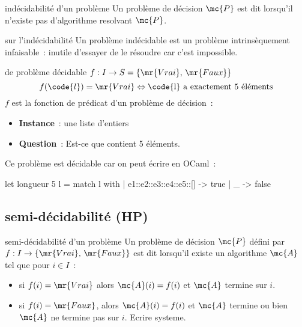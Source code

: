 \begin{adjustwidth}{-3cm}{-3cm}
\begin{definition}{}{indécidabilité d'un problème}
    Un problème de décision $\mc{P}$ est dit  lorsqu'il n'existe pas d'algorithme resolvant $\mc{P}$.
\end{definition}

\begin{remarque}{}{sur l'indécidabilité}
    Un problème indécidable est un problème intrinsèquement infaisable~: inutile d'essayer de le résoudre car c'est impossible.
\end{remarque}

\begin{exemple}{}{de problème décidable}
    $f : I \to S = \{\mr{Vrai},\, \mr{Faux}\}$\\
    $$f(\code{l}) = \mr{Vrai} \Leftrightarrow \text{\code{l} a exactement 5 éléments}$$
    $f$ est la fonction de prédicat d'un problème de décision~:
    \begin{itemize}
        \item \textbf{Instance}~:  une liste d'entiers
        \item \textbf{Question}~: Est-ce que  contient 5 éléments.
    \end{itemize}
    Ce problème est décidable car on peut écrire en OCaml~:
    \begin{lstOCaml}
    let longueur 5 l =
        match l with
        | e1::e2::e3::e4::e5::[] -> true
        | _ -> false
    \end{lstOCaml}
\end{exemple}

\subsection{semi-décidabilité (HP)}

\begin{definition}{}{semi-décidabilité d'un problème}
    Un problème de décision $\mc{P}$ défini par $f:I \to \{\mr{Vrai},\, \mr{Faux}\}$ est dit  lorsqu'il existe un algorithme $\mc{A}$ tel que pour $i \in I$~:
    \begin{itemize}
        \item si $f(i) = \mr{Vrai}$ alors $\mc{A}(i) = f(i)$ et $\mc{A}$ termine sur $i$.
        \item si $f(i) = \mr{Faux}$, alors $\mc{A}(i) = f(i)$ et $\mc{A}$ termine ou bien $\mc{A}$ ne termine pas sur $i$. Ecrire systeme.
    \end{itemize}
\end{definition}


\end{adjustwidth}
